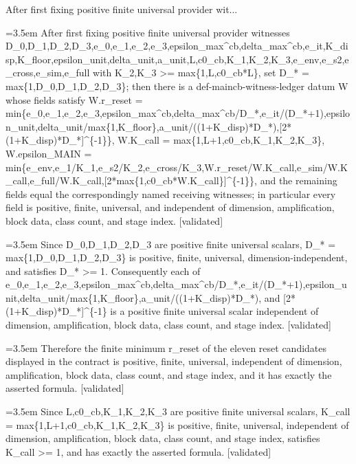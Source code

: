 \documentclass{article}
\newcommand{\step}[1]{\par\noindent\hangindent=3.5em\hangafter=1%
  \makebox[3.5em][l]{\textbf{#1.}}}
\newcommand{\steptag}[1]{\hfill{\small\textsf{[#1]}}}
\begin{document}
\begin{proofbox}{After first fixing positive finite universal provider wit...}
\step{1} After first fixing positive finite universal provider witnesses D\_0,D\_1,D\_2,D\_3,e\_0,e\_1,e\_2,e\_3,epsilon\_max\textasciicircum{}cb,delta\_max\textasciicircum{}cb,e\_it,K\_disp,K\_floor,epsilon\_unit,delta\_unit,a\_unit,L,c0\_cb,K\_1,K\_2,K\_3,e\_env,e\_s2,e\_cross,e\_sim,e\_full with K\_2,K\_3 >= max\{1,L,c0\_cb*L\}, set D\_* = max\{1,D\_0,D\_1,D\_2,D\_3\}; then there is a def-maincb-witness-ledger datum W whose fields satisfy W.r\_reset = min\{e\_0,e\_1,e\_2,e\_3,epsilon\_max\textasciicircum{}cb,delta\_max\textasciicircum{}cb/D\_*,e\_it/(D\_*+1),epsilon\_unit,delta\_unit/max\{1,K\_floor\},a\_unit/((1+K\_disp)*D\_*),[2*(1+K\_disp)*D\_*]\textasciicircum{}\{-1\}\}, W.K\_call = max\{1,L+1,c0\_cb,K\_1,K\_2,K\_3\}, W.epsilon\_MAIN = min\{e\_env,e\_1/K\_1,e\_s2/K\_2,e\_cross/K\_3,W.r\_reset/W.K\_call,e\_sim/W.K\_call,e\_full/W.K\_call,[2*max\{1,c0\_cb*W.K\_call\}]\textasciicircum{}\{-1\}\}, and the remaining fields equal the correspondingly named receiving witnesses; in particular every field is positive, finite, universal, and independent of dimension, amplification, block data, class count, and stage index. \steptag{validated} \\[6pt]
\step{1.1} Since D\_0,D\_1,D\_2,D\_3 are positive finite universal scalars, D\_* = max\{1,D\_0,D\_1,D\_2,D\_3\} is positive, finite, universal, dimension-independent, and satisfies D\_* >= 1. Consequently each of e\_0,e\_1,e\_2,e\_3,epsilon\_max\textasciicircum{}cb,delta\_max\textasciicircum{}cb/D\_*,e\_it/(D\_*+1),epsilon\_unit,delta\_unit/max\{1,K\_floor\},a\_unit/((1+K\_disp)*D\_*), and [2*(1+K\_disp)*D\_*]\textasciicircum{}\{-1\} is a positive finite universal scalar independent of dimension, amplification, block data, class count, and stage index. \steptag{validated} \\[4pt]
\step{1.2} Therefore the finite minimum r\_reset of the eleven reset candidates displayed in the contract is positive, finite, universal, independent of dimension, amplification, block data, class count, and stage index, and it has exactly the asserted formula. \steptag{validated} \\[4pt]
\step{1.3} Since L,c0\_cb,K\_1,K\_2,K\_3 are positive finite universal scalars, K\_call = max\{1,L+1,c0\_cb,K\_1,K\_2,K\_3\} is positive, finite, universal, independent of dimension, amplification, block data, class count, and stage index, satisfies K\_call >= 1, and has exactly the asserted formula. \steptag{validated} \\[4pt]

\end{proofbox}
\end{document}
